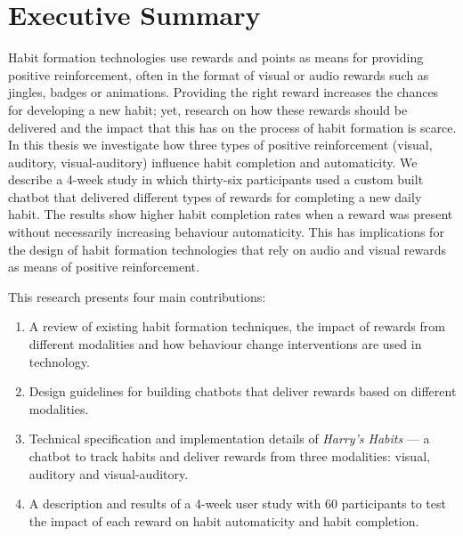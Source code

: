 
\section*{Executive Summary}
Habit formation technologies use rewards and points as means for providing positive reinforcement, often in the format of visual or audio rewards such as jingles, badges or animations. Providing the right reward increases the chances for developing a new habit; yet, research on how these rewards should be delivered and the impact that this has on the process of habit formation is scarce. In this thesis we investigate how three types of positive reinforcement (visual, auditory, visual-auditory) influence habit completion and automaticity. We describe a 4-week study in which thirty-six participants used a custom built chatbot that delivered different types of rewards for completing a new daily habit. The results show higher habit completion rates when a reward was present without necessarily increasing behaviour automaticity. This has implications for the design of habit formation technologies that rely on audio and visual rewards as means of positive reinforcement.

This research presents four main contributions:

\begin{enumerate}
  \item A review of existing habit formation techniques, the impact of rewards from different modalities and how behaviour change interventions are used in technology.
  \item Design guidelines for building chatbots that deliver rewards based on different modalities.
  \item Technical specification and implementation details of \textit{Harry's Habits} --- a chatbot to track habits and deliver rewards from three modalities: visual, auditory and visual-auditory.
  \item A description and results of a 4-week user study with 60 participants to test the impact of each reward on habit automaticity and habit completion.
\end{enumerate}

\newpage
